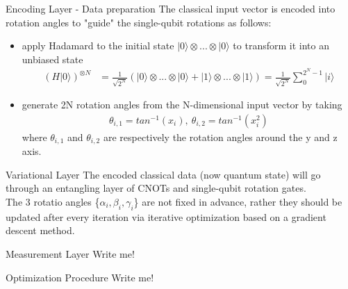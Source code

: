 \begin{frame}{Encoding Layer - Data preparation}
	The \alert{classical} input vector is encoded into rotation angles to "guide" the single-qubit rotations as follows:
	\begin{itemize}
	\item<2-> 
		apply Hadamard to the initial state $|0\rangle \otimes ... \otimes |0 \rangle$ to transform it into an \alert{unbiased} state
		\begin{align*}
			(H | 0 \rangle)^{\otimes N} &= \frac{1}{\sqrt{2^N}} (|0\rangle \otimes ... \otimes |0\rangle + |1\rangle \otimes ... \otimes |1\rangle) 
				=  \frac{1}{\sqrt{2^N}} \sum^{2^N - 1}_0 |i\rangle
		\end{align*}
	  \item<3->
		generate 2N \alert{rotation} angles from the N-dimensional input vector by taking
		\begin{align*}
			\theta_{i,1} = tan^{-1}(x_i), \ \theta_{i,2} = tan^{-1} (x^2_i)
		\end{align*}
		where $\theta_{i,1}$ and $\theta_{i,2}$ are respectively the rotation angles around the y and z axis.
	\end{itemize}
\end{frame}

\begin{frame}{Variational Layer}
	The encoded classical data (now \alert{quantum state}) will go through an entangling layer of CNOTs and single-qubit rotation gates. \\ The 3 rotatio angles \{$\alpha_i, \beta_i, \gamma_i$\} are not fixed in advance, rather they should be updated after every iteration via iterative optimization based on a \alert{gradient descent method}.
\end{frame}

\begin{frame}{Measurement Layer}
	Write me!
\end{frame}


\begin{frame}{Optimization Procedure}
	Write me!
\end{frame}



	